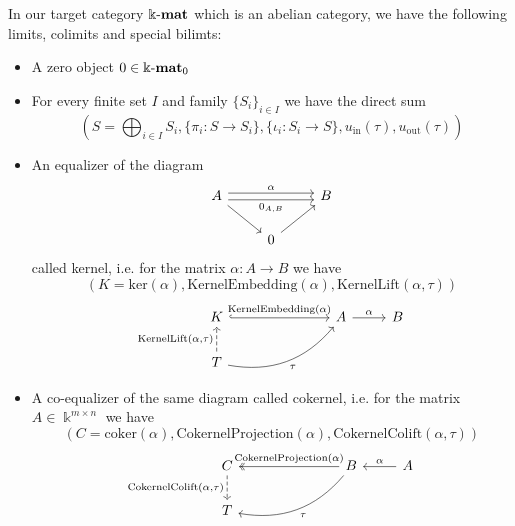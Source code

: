 \begin{example}
In our target category $\Bbbk\textnormal{-}\mathbf{mat}$ which is an abelian category, we have the following limits, colimits and special bilimts:
\begin{itemize}
\item A zero object $0 \in \Bbbk\textnormal{-}\mathbf{mat}_{0}$
\item For every finite set $I$ and family $\{S_{i}\}_{i \in I}$ we have the direct sum
\[
(S = \bigoplus_{i\in I} S_{i}, \{\pi_{i} : S \rightarrow S_{i}\}, \{\iota_{i} : S_{i} \rightarrow S\}, u_{\text{in}}(\tau), u_{\text{out}}(\tau))
\]
\item An equalizer of the diagram 
\[
\begin{tikzcd}
A \arrow[rr, "{0_{A,B}}"', shift right] \arrow[rd] \arrow[rr, "\alpha", shift left] &              & B \\
                                                                               & 0 \arrow[ru] &  
\end{tikzcd}
\]
called kernel, i.e. for the matrix $\alpha : A \rightarrow B$ we have
\[
(K = \mathrm{ker}(\alpha), \mathrm{KernelEmbedding}(\alpha), \mathrm{KernelLift}(\alpha,\tau))
\]
\[
\begin{tikzcd}
K \arrow[rrr, "{\mathrm{KernelEmbedding}(\alpha)}", hook]                              &  &  & A \arrow[r, "\alpha"] & B \\
T \arrow[rrru, "\tau"', bend right] \arrow[u, "{\mathrm{KernelLift}(\alpha,\tau)}", dashed] &  &  &                       &  
\end{tikzcd}
\]
\item A co-equalizer of the same diagram called cokernel, i.e. for the matrix $A \in \Bbbk^{m\times n}$ we have
\[
(C = \mathrm{coker}(\alpha), \mathrm{CokernelProjection}(\alpha), \mathrm{CokernelColift}(\alpha,\tau))
\]
\[
\begin{tikzcd}
C \arrow[d, "{\mathrm{CokernelColift}(\alpha,\tau)}"', dashed] &  &  & B \arrow[lll, "\mathrm{CokernelProjection}(\alpha)"', two heads] \arrow[llld, "\tau", bend left] & A \arrow[l, "\alpha"'] \\
T                                                              &  &  &                                                                                       &                       
\end{tikzcd}
\]


\end{itemize}
\end{example}

